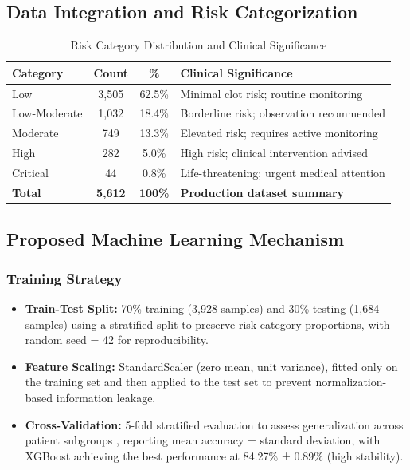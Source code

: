 \documentclass[3p,times,procedia]{elsarticle}
\begin{document}
\subsection{{Data Integration and Risk Categorization}}
\vspace{-2pt}
\begin{table}[h]
\centering
\begin{tabular}{|l|c|c|l|}
\hline
\rowcolor{gray!20}
\textbf{Category} & \textbf{Count} & \textbf{\%} & \textbf{Clinical Significance} \\
\hline
Low & 3,505 & 62.5\% & Minimal clot risk; routine monitoring \\ 
\rowcolor{gray!10}
Low-Moderate & 1,032 & 18.4\% & Borderline risk; observation recommended \\
Moderate & 749 & 13.3\% & Elevated risk; requires active monitoring \\
\rowcolor{gray!10}
High & 282 & 5.0\% & High risk; clinical intervention advised \\
Critical & 44 & 0.8\% & Life-threatening; urgent medical attention \\ 
\hline
\rowcolor{gray!20}
\textbf{Total} & \textbf{5,612} & \textbf{100\%} & \textbf{Production dataset summary} \\
\hline
\end{tabular}

\caption{Risk Category Distribution and Clinical Significance}
\end{table}



\subsection{Proposed Machine Learning Mechanism}
\vspace{-2pt}

\subsubsection{Training Strategy} 
\begin{itemize}

\item \textbf{Train-Test Split:} 70\% training (3,928 samples) and 30\% testing (1,684 samples) using a stratified split to preserve risk category proportions, with random seed = 42 for reproducibility.

\item \textbf{Feature Scaling:} StandardScaler (zero mean, unit variance), fitted only on the training set and then applied to the test set to prevent normalization-based information leakage.

\item \textbf{Cross-Validation:} 5-fold stratified evaluation to assess generalization across patient subgroups \cite{kohavi1995crossvalidation}, reporting mean accuracy ± standard deviation, with XGBoost \cite{chen2016xgboost} achieving the best performance at 84.27\% ± 0.89\% (high stability).
\end{itemize}
\end{document}
